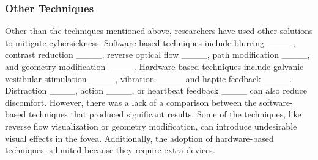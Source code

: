 \subsubsection{Other Techniques}
Other than the techniques mentioned above, researchers have used other solutions to mitigate cybersickness.
Software-based techniques include blurring ____, contrast reduction ____, reverse optical flow ____, path modification ____, and geometry modification ____.
Hardware-based techniques include galvanic vestibular stimulation ____, vibration ____ and haptic feedback ____.
Distraction ____, action ____, or heartbeat feedback ____ can also reduce discomfort.
However, there was a lack of a comparison between the software-based techniques that produced significant results.
Some of the techniques, like reverse flow visualization or geometry modification, can introduce undesirable visual effects in the fovea.
Additionally, the adoption of hardware-based techniques is limited because they require extra devices.



